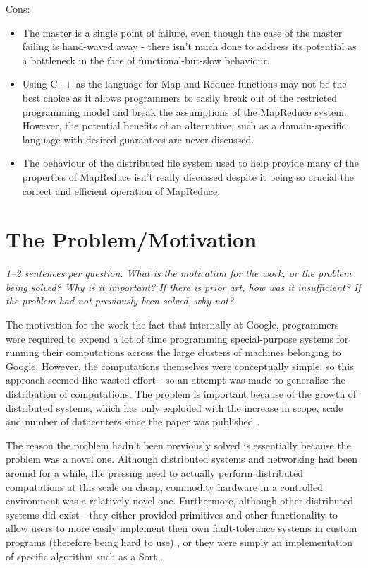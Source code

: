 \documentclass[11pt]{article}
\begin{document}
Cons:

\begin{itemize}

    \item The master is a single point of failure, even though the case of the
    master failing is hand-waved away - there isn't much done to address its
    potential as a bottleneck in the face of functional-but-slow behaviour.

    \item Using C++ as the language for Map and Reduce functions may not be the
    best choice as it allows programmers to easily break out of the restricted
    programming model and break the assumptions of the MapReduce system.
    However, the potential benefits of an alternative, such as a
    domain-specific language with desired guarantees are never discussed.

    \item The behaviour of the distributed file system used to help provide
    many of the properties of MapReduce isn't really discussed despite it being
    so crucial the correct and efficient operation of MapReduce.

\end{itemize}

\section*{The Problem/Motivation}

\textsl{1--2 sentences per question. What is the motivation for the work, or
the problem being solved? Why is it important? If there is prior art, how was
it insufficient? If the problem had not previously been solved, why not?}

The motivation for the work the fact that internally at Google, programmers
were required to expend a lot of time programming special-purpose systems for
running their computations across the large clusters of machines belonging to
Google. However, the computations themselves were conceptually simple, so this
approach seemed like wasted effort - so an attempt was made to generalise the
distribution of computations. The problem is important because of the growth of
distributed systems, which has only exploded with the increase in scope, scale
and number of datacenters since the paper was published
\cite{VirtualizationGrowth}.

The reason the problem hadn't been previously solved is essentially because the
problem was a novel one. Although distributed systems and networking had been
around for a while, the pressing need to actually perform distributed
computations at this scale on cheap, commodity hardware in a controlled
environment was a relatively novel one. Furthermore, although other distributed
systems did exist - they either provided primitives and other functionality to
allow users to more easily implement their own fault-tolerance systems in
custom programs (therefore being hard to use) \cite{River} \cite{MPI}
\cite{BridgingModelForParallelComputation}, or they were simply an
implementation of specific algorithm such as a Sort \cite{NowSort}.
\end{document}
